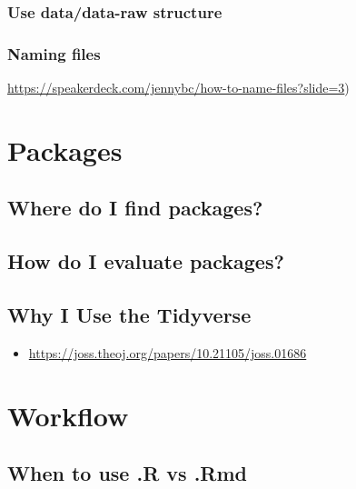 \documentclass[]{book}
\providecommand{\tightlist}{%
  \setlength{\itemsep}{0pt}\setlength{\parskip}{0pt}}
\begin{document}
\hypertarget{use-datadata-raw-structure}{%
\subsubsection{Use data/data-raw structure}\label{use-datadata-raw-structure}}

\hypertarget{naming-files}{%
\subsubsection{Naming files}\label{naming-files}}

\url{https://speakerdeck.com/jennybc/how-to-name-files?slide=3})

\hypertarget{packages}{%
\section{Packages}\label{packages}}

\hypertarget{where-do-i-find-packages}{%
\subsection{Where do I find packages?}\label{where-do-i-find-packages}}

\hypertarget{how-do-i-evaluate-packages}{%
\subsection{How do I evaluate packages?}\label{how-do-i-evaluate-packages}}

\hypertarget{why-i-use-the-tidyverse}{%
\subsection{Why I Use the Tidyverse}\label{why-i-use-the-tidyverse}}

\begin{itemize}
\tightlist
\item
  \url{https://joss.theoj.org/papers/10.21105/joss.01686}
\end{itemize}

\hypertarget{workflow}{%
\section{Workflow}\label{workflow}}

\hypertarget{when-to-use-.r-vs-.rmd}{%
\subsection{When to use .R vs .Rmd}\label{when-to-use-.r-vs-.rmd}}
\end{document}
